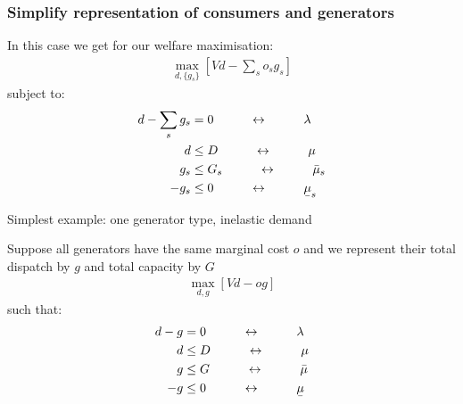 \documentclass[10pt,dvipsnames]{beamer}
\def\l{\lambda}
\def\m{\mu}
\newcommand{\ubar}[1]{\text{\b{$#1$}}}
\begin{document}
\begin{frame}[fragile]
  \frametitle{Simplify representation of consumers and generators}

  In this case we get for our welfare maximisation:
  \begin{align*}
    \max_{d, \{g_s\} }\left[ Vd  -  \sum_s o_s g_s \right]
  \end{align*}
  subject to:
  \begin{align*}
    d -  \sum_s g_s  & = 0 \hspace{1cm} \leftrightarrow \hspace{1cm} \l \\
    d & \leq D  \hspace{1cm} \leftrightarrow \hspace{1cm} \m \\
        g_s  & \leq  G_s  \hspace{1cm}\leftrightarrow\hspace{1cm} \bar{\m}_s \\
    - g_s  & \leq  0  \hspace{1cm}\leftrightarrow\hspace{1cm} \ubar{\m}_s
  \end{align*}

\end{frame}



\begin{frame}{Simplest example: one generator type, inelastic demand}

  Suppose all generators have the same marginal cost $o$ and we
  represent their total dispatch by $g$ and total capacity by $G$
  \begin{align*}
    \max_{d, g }\left[ Vd  -  og\right]
  \end{align*}
  such that:
  \begin{align*}
    d - g & = 0  \hspace{1cm}\leftrightarrow\hspace{1cm} \l \\
    d & \leq D  \hspace{1cm} \leftrightarrow \hspace{1cm} \m \\
    g  & \leq  G  \hspace{1cm}\leftrightarrow\hspace{1cm} \bar{\m} \\
    - g  & \leq  0  \hspace{1cm}\leftrightarrow\hspace{1cm} \ubar{\m}
  \end{align*}

\end{frame}
\end{document}
